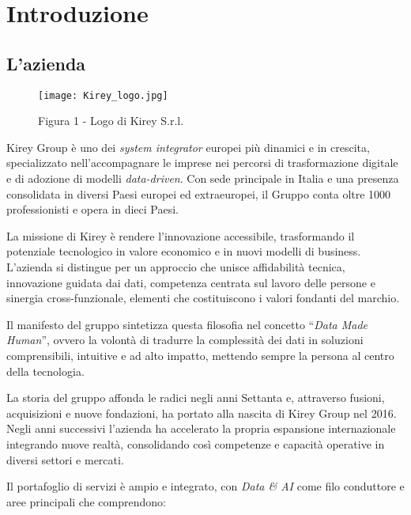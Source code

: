\chapter{Introduzione}
\label{cap:introduzione}

\section{L'azienda}

\begin{figure}[!h] 
    \centering 
    \texttt{[image: Kirey\_logo.jpg]} 
    \caption{Figura 1 - Logo di Kirey S.r.l.}
\end{figure}

Kirey Group è uno dei \emph{system integrator} europei più dinamici e in crescita, specializzato nell'accompagnare le imprese nei percorsi di trasformazione digitale
 e di adozione di modelli \emph{data-driven}. Con sede principale in Italia e una presenza consolidata in diversi Paesi europei ed extraeuropei, 
 il Gruppo conta oltre 1000 professionisti e opera in dieci Paesi.

La missione di Kirey è rendere l'innovazione accessibile, trasformando il potenziale tecnologico in valore economico e in nuovi modelli di business. 
L'azienda si distingue per un approccio che unisce affidabilità tecnica, innovazione guidata dai dati, competenza centrata sul lavoro delle persone e sinergia cross-funzionale, 
elementi che costituiscono i valori fondanti del marchio.

Il manifesto del gruppo sintetizza questa filosofia nel concetto “\emph{Data Made Human}”, ovvero la volontà di tradurre la complessità dei dati in soluzioni comprensibili, 
intuitive e ad alto impatto, mettendo sempre la persona al centro della tecnologia.

La storia del gruppo affonda le radici negli anni Settanta e, attraverso fusioni, acquisizioni e nuove fondazioni, ha portato alla nascita di Kirey Group nel 2016. 
Negli anni successivi l'azienda ha accelerato la propria espansione internazionale integrando nuove realtà, consolidando così competenze e capacità operative in diversi settori e mercati.

Il portafoglio di servizi è ampio e integrato, con \emph{Data \& AI} come filo conduttore e aree principali che comprendono:

